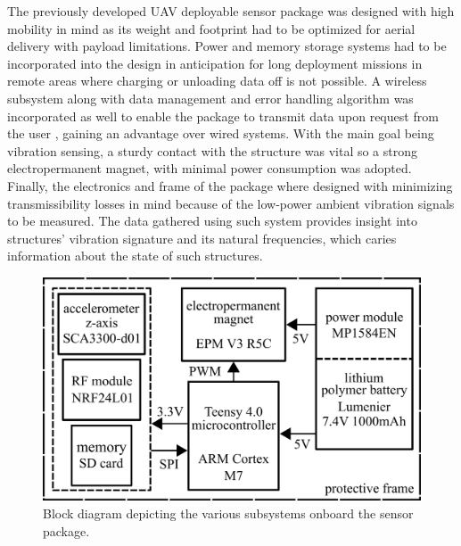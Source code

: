 \documentclass[]{spie}  %
\newcommand{\bl}[1]{\textcolor[rgb]{0.00,0.00,1.00}{#1}}
\begin{document}
The previously developed UAV deployable sensor package was designed with high mobility in mind as its weight and footprint had to be optimized for aerial delivery with payload limitations. Power and memory storage systems had to be incorporated into the design in anticipation for long deployment missions in remote areas where charging or unloading data off is not possible. A wireless subsystem along with data management and error handling algorithm was incorporated as well to enable the package to transmit data upon request from the user \cite{Sim2013}, gaining an advantage over wired systems.  With the main goal being vibration sensing, a sturdy contact with the structure was vital so a strong electropermanent magnet, with minimal power consumption was adopted. \bl{F}inally, the electronics and frame of the package where designed with minimizing transmissibility losses in mind because of the low-power ambient vibration signals to be measured. The data gathered using such system provides insight into structures' vibration signature and its natural frequencies, which caries information about the state of such structures\cite{Filippo2016}.  
	
	\begin{figure} [H]
		\centering
		\includegraphics[width=4.66 in]{figures/SPIE Package Schematic.png}
		\caption{Block diagram depicting the various subsystems onboard the sensor package.}
		\label{fig:SPIE Package Schematic} 
	\end{figure} 	
	
\end{document}
